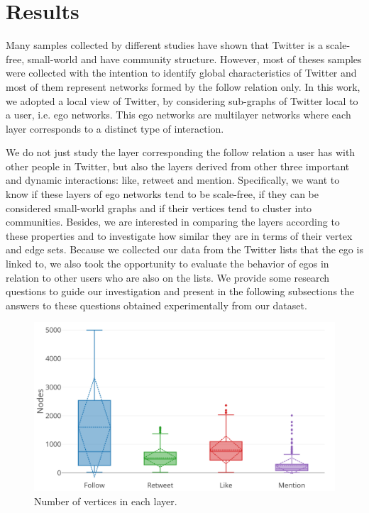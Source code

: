 \chapter{Results}
\label{cap:Results}

Many samples collected by different studies have shown that Twitter is a scale-free\cite{Kwak:2010,Borondo:2016}, small-world\cite{Java:2007} and have community structure\cite{Java:2007,Wang2012,Darmon2013,Darmon2015,Bedi2016}. However, most of theses samples were collected with the intention to identify global characteristics of Twitter and most of them represent  networks formed by the follow relation only. In this work, we adopted a local view of Twitter, by considering sub-graphs of Twitter local to a user, i.e. ego networks. This ego networks are multilayer networks where each layer corresponds to a distinct type of interaction. 

We do not just study the layer corresponding the follow relation a user has with other people in Twitter, but also the layers derived from other three important and dynamic interactions: like, retweet and mention. Specifically, we want to know if these layers of ego networks tend to be scale-free, if they can be considered small-world graphs and if their vertices tend to cluster into communities. Besides, we are interested in comparing the layers according to these properties and to investigate how similar they are in terms of their vertex and edge sets. Because we collected our data from the Twitter lists that the ego is linked to, we also took the opportunity to evaluate the behavior of egos in relation to other users who are also on the lists. We provide some research questions to guide our  investigation and present in the following subsections the answers to these questions obtained experimentally from our dataset.


\begin{figure}[h!tb]
    \centering
    \includegraphics[width=1\textwidth]{fig/net_struct/number_of_nodes.png}
    \caption{Number of vertices in each layer.}
    \label{fig:net_struct_nodes}
\end{figure}


